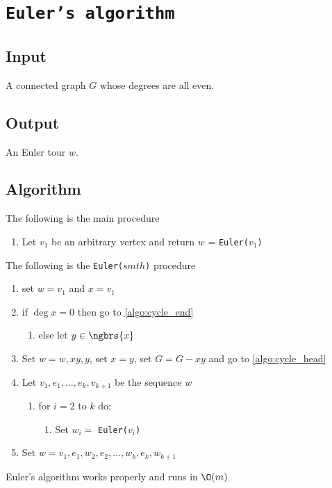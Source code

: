\section{\texttt{Euler's algorithm}}
\subsection{Input}
    A connected graph $G$ whose degrees are all even.
\subsection{Output}
    An Euler tour $w$.
\subsection{Algorithm}
The following is the main procedure
\begin{enumerate}
    \item Let $v_1$ be an arbitrary vertex and return $w$ = \texttt{Euler($v_1$)}
\end{enumerate}
The following is the \texttt{Euler($smth$)} procedure
\begin{enumerate}
    \item set $w = v_1$ and $x = v_1$
    \item \label{algo:cycle_head} if $\deg{x} = 0$ then go to \ref{algo:cycle_end}
    \begin{enumerate}
        \item else let $y \in \ngbrs{x}$
    \end{enumerate}
    \item Set $w = w, xy, y$, set $x = y$, set $G = G - xy$ and go to \ref{algo:cycle_head}
    \item \label{algo:cycle_end} Let $v_1, e_1, \dots, e_k, v_{k + 1}$ be the sequence $w$
    \begin{enumerate}
        \item for $i = 2$ to $k$ do:
        \begin{enumerate}
            \item Set $w_i =$ \texttt{Euler($v_i$)}
        \end{enumerate}
    \end{enumerate}
    \item Set $w = v_1, e_1, w_2, e_2, \dots, w_k, e_k, w_{k + 1}$
\end{enumerate}
\begin{customtheorem}{1.29}
\label{theorem:1.29}
    Euler's algorithm works properly and runs in $\O(m)$
\end{customtheorem}
